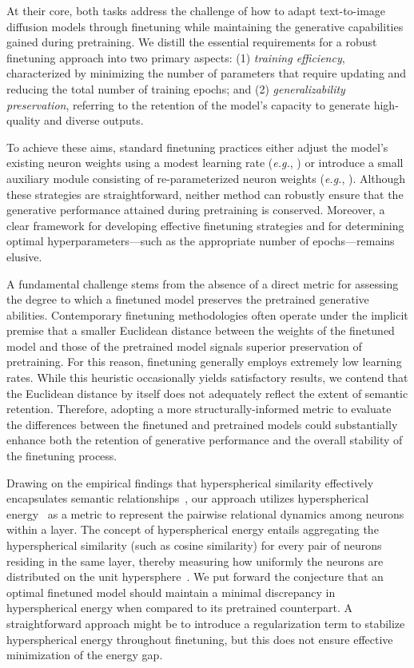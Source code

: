 At their core, both tasks address the challenge of how to adapt text-to-image diffusion models through finetuning while maintaining the generative capabilities gained during pretraining. We distill the essential requirements for a robust finetuning approach into two primary aspects: (1) \emph{training efficiency}, characterized by minimizing the number of parameters that require updating and reducing the total number of training epochs; and (2) \emph{generalizability preservation}, referring to the retention of the model's capacity to generate high-quality and diverse outputs. 

To achieve these aims, standard finetuning practices either adjust the model’s existing neuron weights using a modest learning rate (\emph{e.g.}, \cite{ruiz2023dreambooth}) or introduce a small auxiliary module consisting of re-parameterized neuron weights (\emph{e.g.}, \cite{hulora2022,zhang2023adding}). Although these strategies are straightforward, neither method can robustly ensure that the generative performance attained during pretraining is conserved. Moreover, a clear framework for developing effective finetuning strategies and for determining optimal hyperparameters—such as the appropriate number of epochs—remains elusive.

A fundamental challenge stems from the absence of a direct metric for assessing the degree to which a finetuned model preserves the pretrained generative abilities. Contemporary finetuning methodologies often operate under the implicit premise that a smaller Euclidean distance between the weights of the finetuned model and those of the pretrained model signals superior preservation of pretraining. For this reason, finetuning generally employs extremely low learning rates. While this heuristic occasionally yields satisfactory results, we contend that the Euclidean distance by itself does not adequately reflect the extent of semantic retention. Therefore, adopting a more structurally-informed metric to evaluate the differences between the finetuned and pretrained models could substantially enhance both the retention of generative performance and the overall stability of the finetuning process.

Drawing on the empirical findings that hyperspherical similarity effectively encapsulates semantic relationships~\cite{liu2017deep,liu2018decoupled,chen2020angular}, our approach utilizes hyperspherical energy~\cite{liu2018learning} as a metric to represent the pairwise relational dynamics among neurons within a layer. The concept of hyperspherical energy entails aggregating the hyperspherical similarity (such as cosine similarity) for every pair of neurons residing in the same layer, thereby measuring how uniformly the neurons are distributed on the unit hypersphere~\cite{liu2021learning}. We put forward the conjecture that an optimal finetuned model should maintain a minimal discrepancy in hyperspherical energy when compared to its pretrained counterpart. A straightforward approach might be to introduce a regularization term to stabilize hyperspherical energy throughout finetuning, but this does not ensure effective minimization of the energy gap. 

